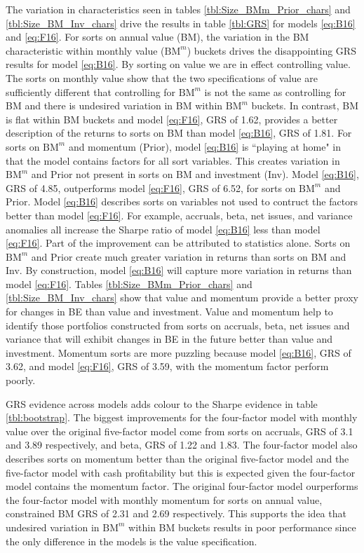 The variation in characteristics seen in tables \ref{tbl:Size_BMm_Prior_chars}
and \ref{tbl:Size_BM_Inv_chars} drive the results in table \ref{tbl:GRS}
for models \ref{eq:B16} and \ref{eq:F16}.
For sorts on annual value (BM), the variation in the BM characteristic within
monthly value ($\text{BM}^m$) buckets drives the disappointing GRS results for
model \ref{eq:B16}.
By sorting on value we are in effect controlling value.
The sorts on monthly value show that the two specifications of value are
sufficiently different that controlling for $\text{BM}^m$ is not the same as
controlling for BM and there is undesired variation in BM within $\text{BM}^m$
buckets.
In contrast, BM is flat within BM buckets and model \ref{eq:F16}, GRS of 1.62,
provides a better description of the returns to sorts on BM than model
\ref{eq:B16}, GRS of 1.81.
For sorts on $\text{BM}^m$ and momentum (Prior), model \ref{eq:B16} is
``playing at home" in that the model contains factors for all sort variables.
This creates variation in $\text{BM}^m$ and Prior not present in sorts on BM
and investment (Inv). Model \ref{eq:B16}, GRS of 4.85, outperforms model
\ref{eq:F16}, GRS of 6.52, for sorts on $\text{BM}^m$ and Prior.
Model \ref{eq:B16} describes sorts on
variables not used to contruct the factors better than model \ref{eq:F16}.
For example, accruals, beta, net issues, and variance anomalies all
increase the Sharpe ratio of model \ref{eq:B16} less than model \ref{eq:F16}.
Part of the improvement can be attributed to statistics alone.
Sorts on $\text{BM}^m$ and Prior create much greater variation in returns than
sorts on BM and Inv.
By construction, model \ref{eq:B16} will capture more variation in returns than
model \ref{eq:F16}.
Tables \ref{tbl:Size_BMm_Prior_chars} and \ref{tbl:Size_BM_Inv_chars} show that
value and momentum provide a better proxy for changes in BE than value and
investment.
Value and momentum help to identify those portfolios constructed from sorts on
accruals, beta, net issues and variance that will exhibit changes in BE in the
future better than value and investment.
Momentum sorts are more puzzling because model \ref{eq:B16}, GRS of 3.62,
and model \ref{eq:F16}, GRS of 3.59, with the momentum factor perform poorly.

GRS evidence across models adds colour to the Sharpe evidence in table
\ref{tbl:bootstrap}.
The biggest improvements for the four-factor model with monthly value over the
original five-factor model come from sorts on accruals, GRS of 3.1 and 3.89
respectively, and beta, GRS of 1.22 and 1.83.
The four-factor model also describes sorts on momentum better than the original
five-factor model and the five-factor model with cash profitability but this is
expected given the four-factor model contains the momentum factor.
The original four-factor model ourperforms the four-factor model with monthly
momentum for sorts on annual value, constrained BM GRS of 2.31 and 2.69
respectively.
This supports the idea that undesired variation in $\text{BM}^m$ within BM
buckets results in poor performance since the only difference in the models is
the value specification.

